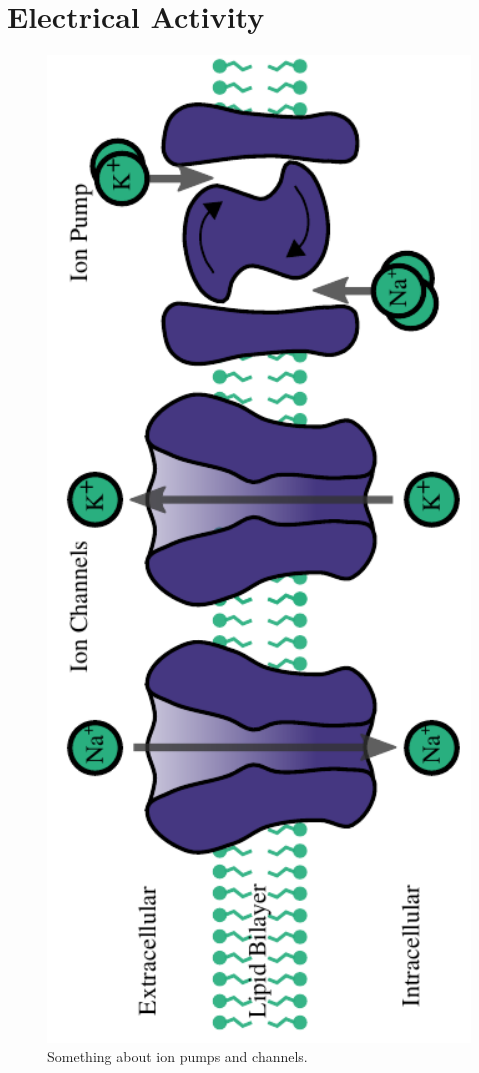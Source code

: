 \documentclass[altfont, fleqn]{uiophd}
\begin{document}
\section{Electrical Activity}
\begin{figure}[h]
    \centering
    \includegraphics[angle=-90,width=1.0\textwidth]{images/2_1/ion_pumps_0.pdf}
    \caption{Something about ion pumps and channels.}
    \label{fig:2_1_ion_channels}
\end{figure}
\end{document}
